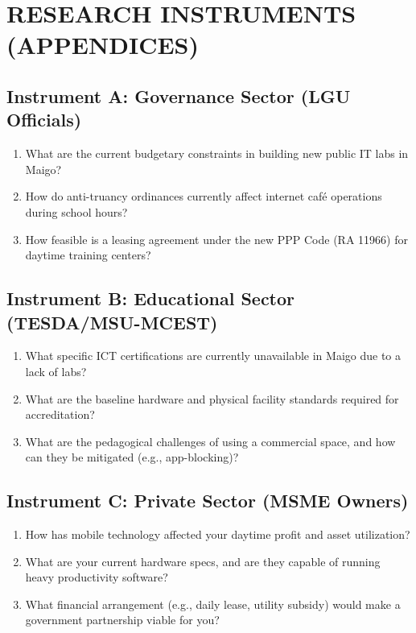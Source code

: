 \section*{RESEARCH INSTRUMENTS (APPENDICES)}

\subsection*{Instrument A: Governance Sector (LGU Officials)}
\begin{enumerate}
    \item What are the current budgetary constraints in building new public IT labs in Maigo?
    \item How do anti-truancy ordinances currently affect internet café operations during school hours?
    \item How feasible is a leasing agreement under the new PPP Code (RA 11966) for daytime training centers?
\end{enumerate}

\subsection*{Instrument B: Educational Sector (TESDA/MSU-MCEST)}
\begin{enumerate}
    \item What specific ICT certifications are currently unavailable in Maigo due to a lack of labs?
    \item What are the baseline hardware and physical facility standards required for accreditation?
    \item What are the pedagogical challenges of using a commercial space, and how can they be mitigated (e.g., app-blocking)?
\end{enumerate}

\subsection*{Instrument C: Private Sector (MSME Owners)}
\begin{enumerate}
    \item How has mobile technology affected your daytime profit and asset utilization?
    \item What are your current hardware specs, and are they capable of running heavy productivity software?
    \item What financial arrangement (e.g., daily lease, utility subsidy) would make a government partnership viable for you?
\end{enumerate}